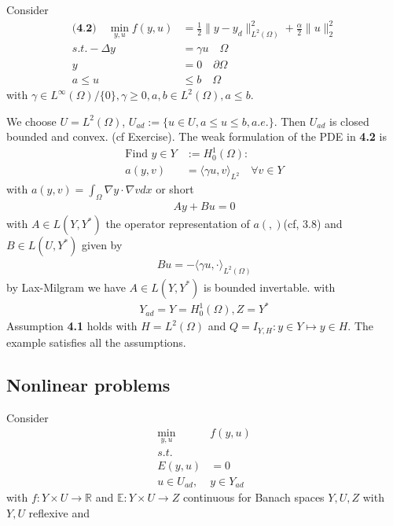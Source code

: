 \begin{example}
	Consider 
	\begin{align*}
		\textbf{(4.2)}\quad
		\min_{y, u} f(y, u) &= \frac{1}{2}\|y - y_d\|^2_{L^2(\Omega)} + \frac{\alpha}{2} \|u\|^2_2\\
		s.t. -\Delta y &= \gamma u \quad \Omega\\
			y &= 0 \quad \partial \Omega\\
			a \le u &\le b \quad \Omega
	\end{align*}
	with $\gamma \in L^\infty(\Omega) \slash \{0\}, \gamma \geq 0, a , b \in L^2(\Omega), a \le b$. \par 
	We choose $U = L^2(\Omega)$, $U_{ad}:= \{ u \in U, a \le u \le b , a.e. \}$. Then $U_{ad}$ is closed bounded and convex. (cf Exercise). The weak formulation of the PDE in \textbf{4.2} is 
	\begin{align*}
		\text{Find } y \in Y&:= H_0^1(\Omega):\\
		a(y, v) &= \langle \gamma u, v \rangle_{L^2} \quad \forall v \in Y
	\end{align*}
	with $a(y, v) = \int_\Omega \nabla y \cdot \nabla v dx$ or short
	\begin{align*}
		Ay + Bu = 0
	\end{align*}
	with $A \in L(Y, Y^*)$ the operator representation of $a(, )$(cf, 3.8) and $B \in L(U, Y^*)$ given by 
	\begin{align*}
		Bu = - \langle \gamma u, \cdot \rangle_{L^2(\Omega)}
	\end{align*}
	by Lax-Milgram we have $A \in L(Y, Y^*)$ is bounded invertable. with 
	\begin{align*}
		Y_{ad} = Y = H_0^1(\Omega), Z = Y^*
	\end{align*}
	Assumption \textbf{4.1} holds with $H= L^2(\Omega)$ and $Q = I_{Y, H}: y \in Y \mapsto y \in H$. The example satisfies all the assumptions. 
\end{example}


\subsection{Nonlinear problems}
Consider 
\begin{align*}
	\min_{y, u} &f(y, u)\\
	s.t.\\
	 E(y, u) &= 0\\
	 u \in U_{ad},& y \in Y_{ad}
\end{align*}
with $f: Y \times U \rightarrow \mathbb{R}$ and $\mathbb{E}: Y \times U \rightarrow Z$ continuous for Banach spaces $Y, U, Z$ with $Y, U$ reflexive and 

